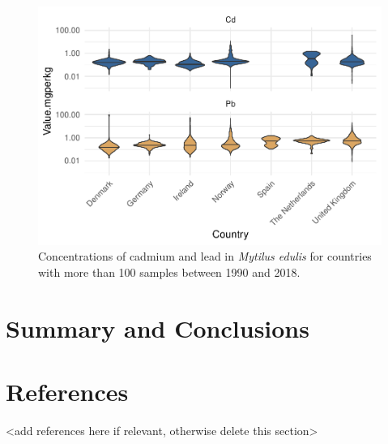 \documentclass[
  12pt,
]{article}
\begin{document}
\begin{figure}
\centering
\includegraphics{McCrory_ENV972_Project_files/figure-latex/unnamed-chunk-6-1.pdf}
\caption{Concentrations of cadmium and lead in \emph{Mytilus edulis} for
countries with more than 100 samples between 1990 and 2018.}
\end{figure}

\newpage

\hypertarget{summary-and-conclusions}{%
\section{Summary and Conclusions}\label{summary-and-conclusions}}

\newpage

\hypertarget{references}{%
\section{References}\label{references}}

\textless add references here if relevant, otherwise delete this
section\textgreater{}
\end{document}
